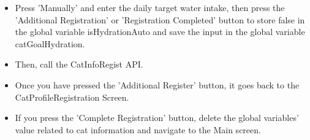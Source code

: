 \documentclass[conference]{IEEEtran}
\begin{document}
\begin{itemize}
\begin{itemize}
        \item Press 'Manually' and enter the daily target water intake, then press the 'Additional Registration' or 'Registration Completed' button to store false in the global variable isHydrationAuto and save the input in the global variable catGoalHydration.
        \item Then, call the CatInfoRegist API.
        \item Once you have pressed the 'Additional Register' button, it goes back to the CatProfileRegistration Screen.
        \item If you press the 'Complete Registration' button, delete the global variables' value related to cat information and navigate to the Main screen.\\
    \end{itemize}
\end{itemize}
\end{document}
